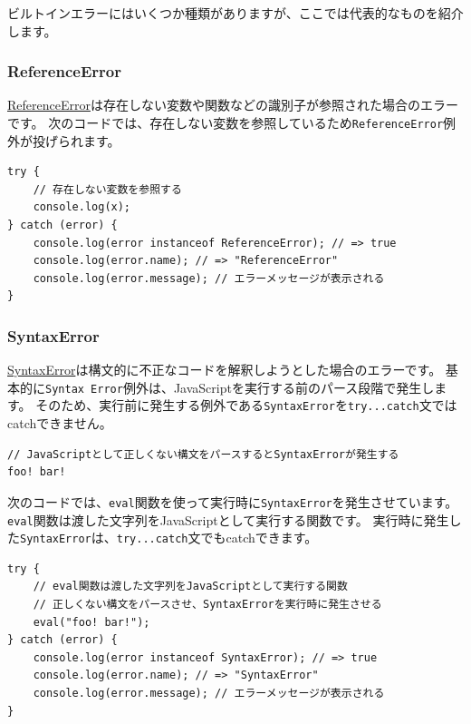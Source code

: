 ビルトインエラーにはいくつか種類がありますが、ここでは代表的なものを紹介します。

\hypertarget{reference-error}{%
\subsubsection{ReferenceError}\label{reference-error}}

\href{https://developer.mozilla.org/ja/docs/Web/JavaScript/Reference/Global_Objects/ReferenceError}{ReferenceError}は存在しない変数や関数などの識別子が参照された場合のエラーです。
次のコードでは、存在しない変数を参照しているため\texttt{ReferenceError}例外が投げられます。

\begin{lstlisting}
try {
    // 存在しない変数を参照する
    console.log(x);
} catch (error) {
    console.log(error instanceof ReferenceError); // => true
    console.log(error.name); // => "ReferenceError"
    console.log(error.message); // エラーメッセージが表示される
}
\end{lstlisting}

\hypertarget{syntax-error}{%
\subsubsection{SyntaxError}\label{syntax-error}}

\href{https://developer.mozilla.org/ja/docs/Web/JavaScript/Reference/Global_Objects/SyntaxError}{SyntaxError}は構文的に不正なコードを解釈しようとした場合のエラーです。
基本的に\texttt{Syntax Error}例外は、JavaScriptを実行する前のパース段階で発生します。
そのため、実行前に発生する例外である\texttt{SyntaxError}を\texttt{try...catch}文ではcatchできません。

\begin{lstlisting}
// JavaScriptとして正しくない構文をパースするとSyntaxErrorが発生する
foo! bar!
\end{lstlisting}

次のコードでは、\texttt{eval}関数を使って実行時に\texttt{SyntaxError}を発生させています。
\texttt{eval}関数は渡した文字列をJavaScriptとして実行する関数です。
実行時に発生した\texttt{SyntaxError}は、\texttt{try...catch}文でもcatchできます。

\begin{lstlisting}
try {
    // eval関数は渡した文字列をJavaScriptとして実行する関数
    // 正しくない構文をパースさせ、SyntaxErrorを実行時に発生させる
    eval("foo! bar!");
} catch (error) {
    console.log(error instanceof SyntaxError); // => true
    console.log(error.name); // => "SyntaxError"
    console.log(error.message); // エラーメッセージが表示される
}
\end{lstlisting}

